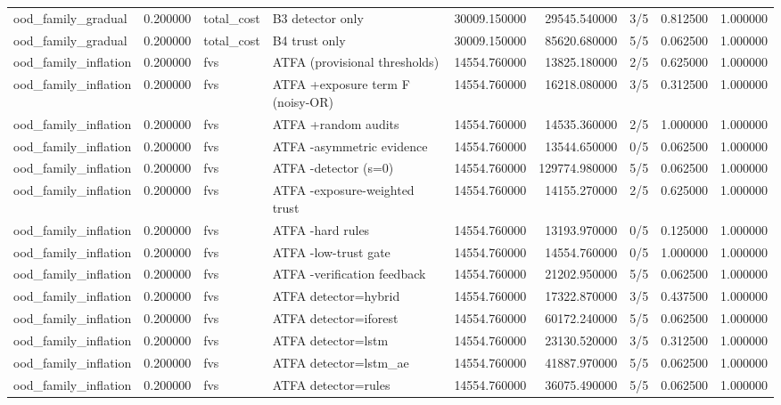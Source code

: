 \begin{tabular}{lrllrrlrr}
ood\_family\_gradual & 0.200000 & total\_cost & B3 detector only & 30009.150000 & 29545.540000 & 3/5 & 0.812500 & 1.000000 \\
ood\_family\_gradual & 0.200000 & total\_cost & B4 trust only & 30009.150000 & 85620.680000 & 5/5 & 0.062500 & 1.000000 \\
ood\_family\_inflation & 0.200000 & fvs & ATFA (provisional thresholds) & 14554.760000 & 13825.180000 & 2/5 & 0.625000 & 1.000000 \\
ood\_family\_inflation & 0.200000 & fvs & ATFA +exposure term F (noisy-OR) & 14554.760000 & 16218.080000 & 3/5 & 0.312500 & 1.000000 \\
ood\_family\_inflation & 0.200000 & fvs & ATFA +random audits & 14554.760000 & 14535.360000 & 2/5 & 1.000000 & 1.000000 \\
ood\_family\_inflation & 0.200000 & fvs & ATFA -asymmetric evidence & 14554.760000 & 13544.650000 & 0/5 & 0.062500 & 1.000000 \\
ood\_family\_inflation & 0.200000 & fvs & ATFA -detector (s=0) & 14554.760000 & 129774.980000 & 5/5 & 0.062500 & 1.000000 \\
ood\_family\_inflation & 0.200000 & fvs & ATFA -exposure-weighted trust & 14554.760000 & 14155.270000 & 2/5 & 0.625000 & 1.000000 \\
ood\_family\_inflation & 0.200000 & fvs & ATFA -hard rules & 14554.760000 & 13193.970000 & 0/5 & 0.125000 & 1.000000 \\
ood\_family\_inflation & 0.200000 & fvs & ATFA -low-trust gate & 14554.760000 & 14554.760000 & 0/5 & 1.000000 & 1.000000 \\
ood\_family\_inflation & 0.200000 & fvs & ATFA -verification feedback & 14554.760000 & 21202.950000 & 5/5 & 0.062500 & 1.000000 \\
ood\_family\_inflation & 0.200000 & fvs & ATFA detector=hybrid & 14554.760000 & 17322.870000 & 3/5 & 0.437500 & 1.000000 \\
ood\_family\_inflation & 0.200000 & fvs & ATFA detector=iforest & 14554.760000 & 60172.240000 & 5/5 & 0.062500 & 1.000000 \\
ood\_family\_inflation & 0.200000 & fvs & ATFA detector=lstm & 14554.760000 & 23130.520000 & 3/5 & 0.312500 & 1.000000 \\
ood\_family\_inflation & 0.200000 & fvs & ATFA detector=lstm\_ae & 14554.760000 & 41887.970000 & 5/5 & 0.062500 & 1.000000 \\
ood\_family\_inflation & 0.200000 & fvs & ATFA detector=rules & 14554.760000 & 36075.490000 & 5/5 & 0.062500 & 1.000000 \\

\end{tabular}
